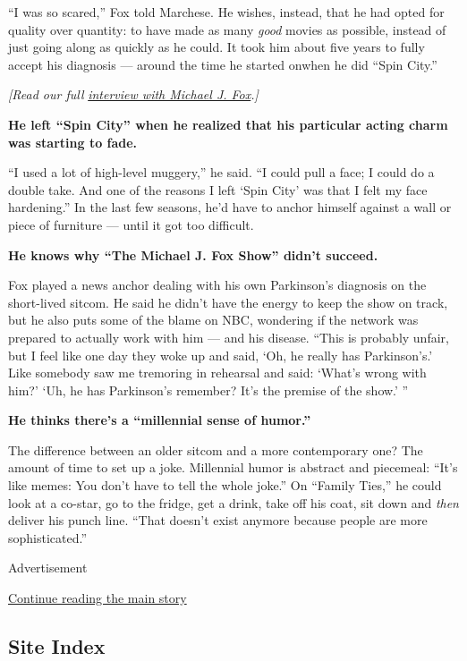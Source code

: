 ``I was so scared,'' Fox told Marchese. He wishes, instead, that he had
opted for quality over quantity: to have made as many \emph{good} movies
as possible, instead of just going along as quickly as he could. It took
him about five years to fully accept his diagnosis --- around the time
he started onwhen he did ``Spin City.''

\emph{{[}Read our full}
\href{https://www.nytimes3xbfgragh.onion/interactive/2019/03/01/magazine/michael-j-fox-parkinsons-acting.html}{\emph{interview
with Michael J. Fox}}\emph{.{]}}

\textbf{He left ``Spin City'' when he realized that his particular
acting charm was starting to fade.}

``I used a lot of high-level muggery,'' he said. ``I could pull a face;
I could do a double take. And one of the reasons I left `Spin City' was
that I felt my face hardening.'' In the last few seasons, he'd have to
anchor himself against a wall or piece of furniture --- until it got too
difficult.

\textbf{He knows why ``The Michael J. Fox Show'' didn't succeed.}

Fox played a news anchor dealing with his own Parkinson's diagnosis on
the short-lived sitcom. He said he didn't have the energy to keep the
show on track, but he also puts some of the blame on NBC, wondering if
the network was prepared to actually work with him --- and his disease.
``This is probably unfair, but I feel like one day they woke up and
said, `Oh, he really has Parkinson's.' Like somebody saw me tremoring in
rehearsal and said: `What's wrong with him?' `Uh, he has Parkinson's
remember? It's the premise of the show.' ''

\textbf{He thinks there's a ``millennial sense of humor.''}

The difference between an older sitcom and a more contemporary one? The
amount of time to set up a joke. Millennial humor is abstract and
piecemeal: ``It's like memes: You don't have to tell the whole joke.''
On ``Family Ties,'' he could look at a co-star, go to the fridge, get a
drink, take off his coat, sit down and \emph{then} deliver his punch
line. ``That doesn't exist anymore because people are more
sophisticated.''

Advertisement

\protect\hyperlink{after-bottom}{Continue reading the main story}

\hypertarget{site-index}{%
\subsection{Site Index}\label{site-index}}


